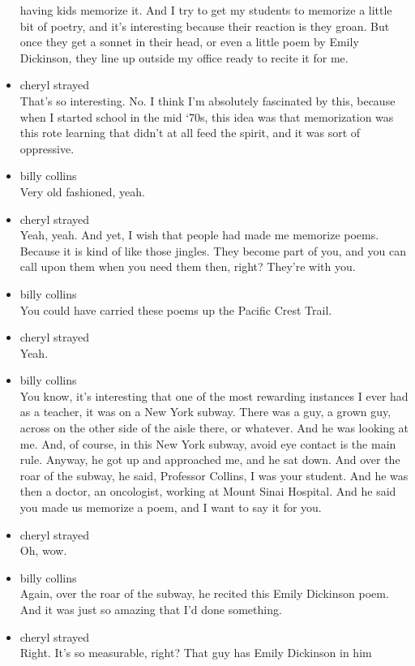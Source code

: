 \begin{itemize}
  having kids memorize it. And I try to get my students to memorize a
  little bit of poetry, and it's interesting because their reaction is
  they groan. But once they get a sonnet in their head, or even a little
  poem by Emily Dickinson, they line up outside my office ready to
  recite it for me.
\item
  cheryl strayed\\
  That's so interesting. No. I think I'm absolutely fascinated by this,
  because when I started school in the mid `70s, this idea was that
  memorization was this rote learning that didn't at all feed the
  spirit, and it was sort of oppressive.
\item
  billy collins\\
  Very old fashioned, yeah.
\item
  cheryl strayed\\
  Yeah, yeah. And yet, I wish that people had made me memorize poems.
  Because it is kind of like those jingles. They become part of you, and
  you can call upon them when you need them then, right? They're with
  you.
\item
  billy collins\\
  You could have carried these poems up the Pacific Crest Trail.
\item
  cheryl strayed\\
  Yeah.
\item
  billy collins\\
  You know, it's interesting that one of the most rewarding instances I
  ever had as a teacher, it was on a New York subway. There was a guy, a
  grown guy, across on the other side of the aisle there, or whatever.
  And he was looking at me. And, of course, in this New York subway,
  avoid eye contact is the main rule. Anyway, he got up and approached
  me, and he sat down. And over the roar of the subway, he said,
  Professor Collins, I was your student. And he was then a doctor, an
  oncologist, working at Mount Sinai Hospital. And he said you made us
  memorize a poem, and I want to say it for you.
\item
  cheryl strayed\\
  Oh, wow.
\item
  billy collins\\
  Again, over the roar of the subway, he recited this Emily Dickinson
  poem. And it was just so amazing that I'd done something.
\item
  cheryl strayed\\
  Right. It's so measurable, right? That guy has Emily Dickinson in him

\end{itemize}

